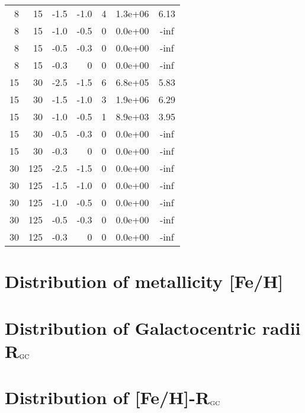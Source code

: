 \documentclass[12pt, a4paper]{article}
\begin{document}
{\begin{table}[ht!]
\begin{tabular}{rrrrrrc}
        8      & 15     & -1.5   & -1.0   & 4      & 1.3e+06 & 6.13       \\
        8      & 15     & -1.0   & -0.5   & 0      & 0.0e+00 & -inf       \\
        8      & 15     & -0.5   & -0.3   & 0      & 0.0e+00 & -inf       \\
        8      & 15     & -0.3   & 0      & 0      & 0.0e+00 & -inf       \\
        \hline
        15     & 30     & -2.5   & -1.5   & 6      & 6.8e+05 & 5.83       \\
        15     & 30     & -1.5   & -1.0   & 3      & 1.9e+06 & 6.29       \\
        15     & 30     & -1.0   & -0.5   & 1      & 8.9e+03 & 3.95       \\
        15     & 30     & -0.5   & -0.3   & 0      & 0.0e+00 & -inf       \\
        15     & 30     & -0.3   & 0      & 0      & 0.0e+00 & -inf       \\
        \hline
        30     & 125    & -2.5   & -1.5   & 0      & 0.0e+00 & -inf       \\
        30     & 125    & -1.5   & -1.0   & 0      & 0.0e+00 & -inf       \\
        30     & 125    & -1.0   & -0.5   & 0      & 0.0e+00 & -inf       \\
        30     & 125    & -0.5   & -0.3   & 0      & 0.0e+00 & -inf       \\
        30     & 125    & -0.3   & 0      & 0      & 0.0e+00 & -inf       \\
        \hline
    \end{tabular}
\end{table}
\clearpage
\restoregeometry
}
\clearpage

\section{Distribution of metallicity [Fe/H]}
\label{sec:FeH}


\section{Distribution of Galactocentric radii R$_{\rm GC}$}
\label{sec:Rgc}


\section{Distribution of [Fe/H]-R$_{\rm GC}$}
\label{sec:FeH-Rgc}





\newpage

 
\end{document}
